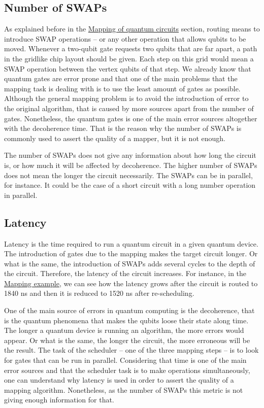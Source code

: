 \subsection{Number of SWAPs}
\label{sec:orgaf1dc29}

As explained before in the \hyperref[sec:orgd680d43]{Mapping of quantum circuits} section, routing means to introduce SWAP operations -- or any other operation that allows qubits to be moved.
Whenever a two-qubit gate requests two qubits that are far apart, a path in the gridlike chip layout should be given.
Each step on this grid would mean a SWAP operation between the vertex qubits of that step.
We already know that quantum gates are error prone and that one of the main problems that the mapping task is dealing with is to use the least amount of gates as possible.
Although the general mapping problem is to avoid the introduction of error to the original algorithm, that is caused by more sources apart from the number of gates.
Nonetheless, the quantum gates is one of the main error sources altogether with the decoherence time.
That is the reason why the number of SWAPs is commonly used to assert the quality of a mapper, but it is not enough.

The number of SWAPs does not give any information about how long the circuit is, or how much it will be affected by decoherence.
The higher number of SWAPs does not mean the longer the circuit necessarily.
The SWAPs can be in parallel, for instance.
It could be the case of a short circuit with a long number operation in parallel.

\subsection{Latency}
\label{sec:org651820a}

Latency is the time required to run a quantum circuit in a given quantum device.
The introduction of gates due to the mapping makes the target circuit longer.
Or what is the same, the introduction of SWAPs  adds several cycles to the depth of the circuit.
Therefore, the latency of the circuit increases.
For instance, in the \hyperref[sec:org9c31051]{Mapping example}, we can see how the latency grows after the circuit is routed to 1840 ns and then it is reduced to 1520 ns after re-scheduling.



One of the main source of errors in quantum computing is the decoherence, that is the quantum phenomena that makes the qubits loose their state along time.
The longer a quantum device is running an algorithm, the more errors would appear.
Or what is the same, the longer the circuit, the more erroneous will be the result.
The task of the scheduler -- one of the three mapping steps -- is to look for gates that can be run in parallel.
Considering that time is one of the main error sources and that the scheduler task is to make operations simultaneously, one can understand why latency is used in order to assert the quality of a mapping algorithm.
Nonetheless, as the number of SWAPs this metric is not giving enough information for that.

